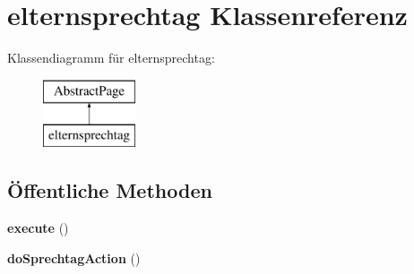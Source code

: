 \hypertarget{classelternsprechtag}{}\section{elternsprechtag Klassenreferenz}
\label{classelternsprechtag}
Klassendiagramm für elternsprechtag\+:\begin{figure}[H]
\begin{center}
\leavevmode
\includegraphics[height=2.000000cm]{classelternsprechtag}
\end{center}
\end{figure}
\subsection*{Öffentliche Methoden}
\begin{DoxyCompactItemize}
\item 
\mbox{\label{classelternsprechtag_aad35323573cfae8740f24c68c159ac3a}} 
{\bfseries execute} ()
\item 
\mbox{\label{classelternsprechtag_a37edbcda23fa0a56811dd3918f473c0c}} 
{\bfseries do\+Sprechtag\+Action} ()
\end{DoxyCompactItemize}
